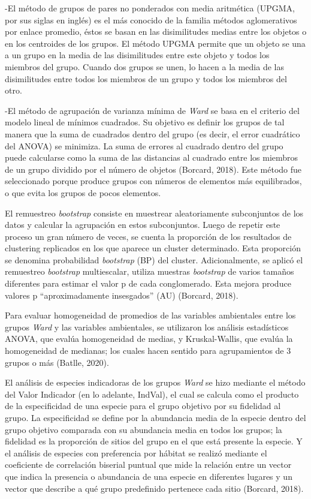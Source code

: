 \documentclass[11pt,]{article}
\begin{document}
-El método de grupos de pares no ponderados con media aritmética (UPGMA,
por sus siglas en inglés) es el más conocido de la familia métodos
aglomerativos por enlace promedio, éstos se basan en las disimilitudes
medias entre los objetos o en los centroides de los grupos. El método
UPGMA permite que un objeto se una a un grupo en la media de las
disimilitudes entre este objeto y todos los miembros del grupo. Cuando
dos grupos se unen, lo hacen a la media de las disimilitudes entre todos
los miembros de un grupo y todos los miembros del otro.

-El método de agrupación de varianza mínima de \emph{Ward} se basa en el
criterio del modelo lineal de mínimos cuadrados. Su objetivo es definir
los grupos de tal manera que la suma de cuadrados dentro del grupo (es
decir, el error cuadrático del ANOVA) se minimiza. La suma de errores al
cuadrado dentro del grupo puede calcularse como la suma de las
distancias al cuadrado entre los miembros de un grupo dividido por el
número de objetos (Borcard, 2018). Este método fue seleccionado porque
produce grupos con números de elementos más equilibrados, o que evita
los grupos de pocos elementos.

El remuestreo \emph{bootstrap} consiste en muestrear aleatoriamente
subconjuntos de los datos y calcular la agrupación en estos
subconjuntos. Luego de repetir este proceso un gran número de veces, se
cuenta la proporción de los resultados de clustering replicados en los
que aparece un cluster determinado. Esta proporción se denomina
probabilidad \emph{bootstrap} (BP) del cluster. Adicionalmente, se
aplicó el remuestreo \emph{bootstrap} multiescalar, utiliza muestras
\emph{bootstrap} de varios tamaños diferentes para estimar el valor p de
cada conglomerado. Esta mejora produce valores p ``aproximadamente
insesgados'' (AU) (Borcard, 2018).

Para evaluar homogeneidad de promedios de las variables ambientales
entre los grupos \emph{Ward} y las variables ambientales, se utilizaron
los análisis estadísticos ANOVA, que evalúa homogeneidad de medias, y
Kruskal-Wallis, que evalúa la homogeneidad de medianas; los cuales hacen
sentido para agrupamientos de 3 grupos o más (Batlle, 2020).

El análisis de especies indicadoras de los grupos \emph{Ward} se hizo
mediante el método del Valor Indicador (en lo adelante, IndVal), el cual
se calcula como el producto de la especificidad de una especie para el
grupo objetivo por su fidelidad al grupo. La especificidad se define por
la abundancia media de la especie dentro del grupo objetivo comparada
con su abundancia media en todos los grupos; la fidelidad es la
proporción de sitios del grupo en el que está presente la especie. Y el
análisis de especies con preferencia por hábitat se realizó mediante el
coeficiente de correlación biserial puntual que mide la relación entre
un vector que indica la presencia o abundancia de una especie en
diferentes lugares y un vector que describe a qué grupo predefinido
pertenece cada sitio (Borcard, 2018).
\end{document}
